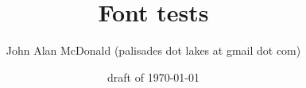 \documentclass[11pt]{PalisadesLakesArticle}
\title{Font tests}
\author{John Alan McDonald 
(palisades dot lakes at gmail dot com)}
\date{draft of \today}
\begin{document}
\def\sharedFolder{../shared/}


\newpage
{}

\end{document}
